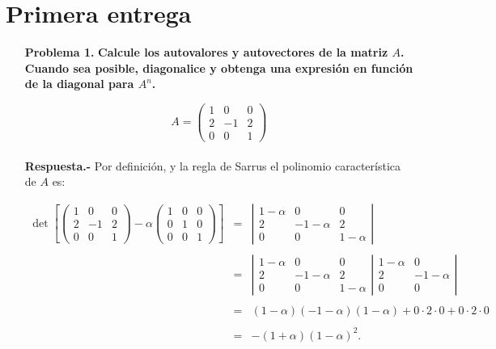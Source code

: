 \section*{\center \large Primera entrega}
\vspace*{1cm}

\begin{enumerate}

    \item[\bfseries Problema 1.] \textbf{\boldmath Calcule los autovalores y autovectores de la matriz $A$. Cuando sea posible, diagonalice y obtenga una expresión en función de la diagonal para $A^n$.}

    $$A=\left(\begin{array}{*{3}{r}}
	1 & 0 & 0 \\
	2 & -1 & 2 \\
	0 & 0 & 1 
    \end{array}\right)$$\\

    \textbf{Respuesta.-}\;  Por definición, y la regla de Sarrus el polinomio característica de $A$ es:
    
    $$ \begin{array}{rcl} 
	\det \left[
    \left(\begin{array}{*{3}{r}}
	1 & 0 & 0 \\
	2 & -1 & 2 \\
	0 & 0 & 1 
    \end{array}\right) - \alpha 
    \left(\begin{array}{*{3}{r}}
	1 & 0 & 0 \\
	0 & 1 & 0 \\
	0 & 0 & 1
\end{array}\right)\right] & = & 
    \left|\begin{array}{*{3}{c}}
	1-\alpha & 0 & 0 \\
	2 & -1-\alpha & 2 \\
	0 & 0 & 1-\alpha
	\end{array}\right| \\\\ 
	&=&  
	\left|\begin{array}{*{3}{c}}
	1-\alpha & 0 & 0 \\
	2 & -1-\alpha & 2 \\
	0 & 0 & 1-\alpha
	\end{array}\right|
	\left.\begin{array}{*{3}{c}}
	1-\alpha & 0  \\
	2 & -1-\alpha  \\
	0 & 0
	\end{array}\right|\\\\
	&=&(1-\alpha)(-1-\alpha)(1-\alpha)+0\cdot 2 \cdot 0 + 0\cdot 2 \cdot 0\\\\
	&=&-(1+\alpha)\left(1-\alpha\right)^2.
    \end{array}$$


\end{enumerate}
